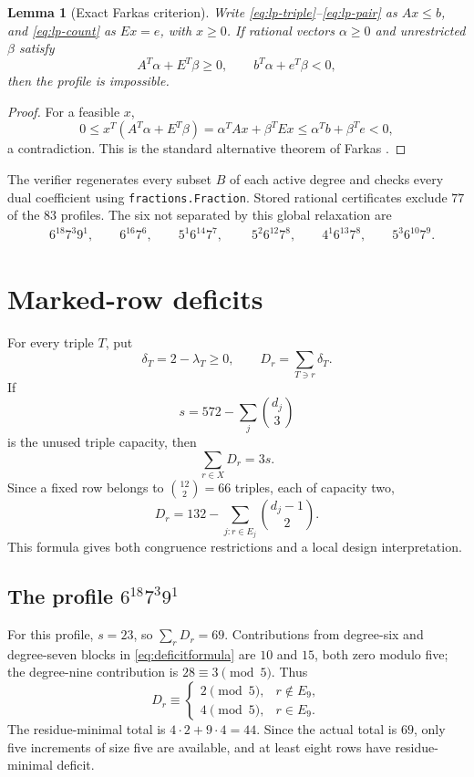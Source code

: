 \documentclass[11pt]{amsart}
\newtheorem{lemma}[theorem]{Lemma}
\begin{document}
\begin{lemma}[Exact Farkas criterion]\label{lem:farkas}
Write \eqref{eq:lp-triple}--\eqref{eq:lp-pair} as $Ax\le b$, and \eqref{eq:lp-count} as $Ex=e$, with $x\ge0$. If rational vectors $\alpha\ge0$ and unrestricted $\beta$ satisfy
\[
 A^T\alpha+E^T\beta\ge0,
 \qquad b^T\alpha+e^T\beta<0,
\]
then the profile is impossible.
\end{lemma}
\begin{proof}
For a feasible $x$,
\[
0\le x^T(A^T\alpha+E^T\beta)
=\alpha^TAx+\beta^TEx
\le\alpha^Tb+\beta^Te<0,
\]
a contradiction. This is the standard alternative theorem of Farkas \cite{Farkas1902}.
\end{proof}

The verifier regenerates every subset $B$ of each active degree and checks every dual coefficient using \texttt{fractions.Fraction}. Stored rational certificates exclude $77$ of the $83$ profiles. The six not separated by this global relaxation are
\begin{equation}\label{eq:sixprofiles}
\begin{split}
&6^{18}7^3 9^1,\qquad 6^{16}7^6,\qquad 5^1 6^{14}7^7,\qquad\
5^2 6^{12}7^8,\qquad 4^1 6^{13}7^8,\qquad 5^3 6^{10}7^9.
\end{split}
\end{equation}

\section{Marked-row deficits}
For every triple $T$, put
\[
  \delta_T=2-\lambda_T\ge0,
  \qquad
  D_r=\sum_{T\ni r}\delta_T.
\]
If
\[
 s=572-\sum_j\binom{d_j}{3}
\]
is the unused triple capacity, then
\begin{equation}\label{eq:deficitsum}
  \sum_{r\in X}D_r=3s.
\end{equation}
Since a fixed row belongs to $\binom{12}{2}=66$ triples, each of capacity two,
\begin{equation}\label{eq:deficitformula}
  D_r=132-\sum_{j:r\in E_j}\binom{d_j-1}{2}.
\end{equation}
This formula gives both congruence restrictions and a local design interpretation.

\subsection{The profile $6^{18}7^3 9^1$}
For this profile, $s=23$, so $\sum_rD_r=69$. Contributions from degree-six and degree-seven blocks in \eqref{eq:deficitformula} are $10$ and $15$, both zero modulo five; the degree-nine contribution is $28\equiv3\pmod5$. Thus
\[
 D_r\equiv
 \begin{cases}
 2\pmod5,&r\notin E_9,\\
 4\pmod5,&r\in E_9.
 \end{cases}
\]
The residue-minimal total is $4\cdot2+9\cdot4=44$. Since the actual total is $69$, only five increments of size five are available, and at least eight rows have residue-minimal deficit.
\end{document}
